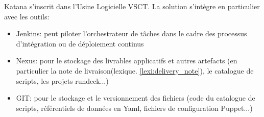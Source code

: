 Katana s'inscrit dans l'Usine Logicielle VSCT. La solution s'intègre en particulier avec les outils:
\begin{itemize}
 \item Jenkins: peut piloter l'orchestrateur de tâches dans le cadre des processus d'intégration ou de déploiement continus
 \item Nexus: pour le stockage des livrables applicatifs et autres artefacts (en particulier la note de livraison(lexique. \ref{lexi:delivery_note}), le catalogue de scripts, les projets rundeck...)
 \item GIT: pour le stockage et le versionnement des fichiers (code du catalogue de scripts, référentiels de données en Yaml, fichiers de configuration Puppet...)
\end{itemize}
